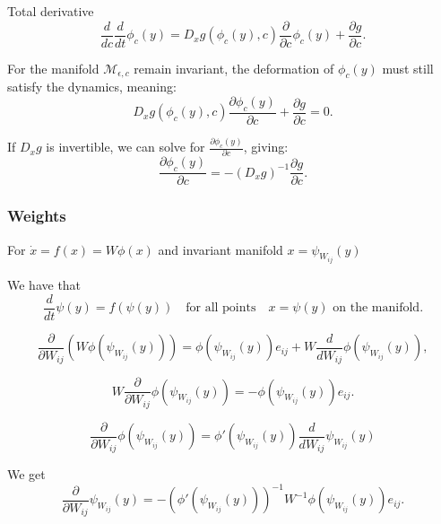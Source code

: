 \documentclass{article}
\theoremstyle{definition} \newtheorem{definition}{Definition}
\theoremstyle{remark} \newtheorem{remark}{Remark}
\newcommand{\manifold}{\mathcal{M}}
\newcounter{ct}
\begin{document}
Total derivative
\begin{equation}
\frac{d}{dc} \frac{d}{dt} \phi_c(y) = D_x g(\phi_c(y), c) \frac{\partial}{\partial c} \phi_c(y) + \frac{\partial g}{\partial c}.
\end{equation}


For the manifold $\manifold_{\epsilon,c}$ remain invariant, the deformation of $\phi_c(y)$ must still satisfy the dynamics, meaning:
\begin{equation}
D_x g(\phi_c(y), c) \frac{\partial \phi_c(y)}{\partial c} + \frac{\partial g}{\partial c} = 0.
\end{equation}

If $D_x g$ is invertible, we can solve for $\frac{\partial \phi_c(y)}{\partial c}$, giving:
\begin{equation}
\frac{\partial \phi_c(y)}{\partial c} = - (D_x g)^{-1} \frac{\partial g}{\partial c}.
\end{equation}


\subsubsection{Weights}
For $\dot x= f(x) =W\phi(x)$ and invariant manifold $x=\psi_{W_{ij}}(y)$

We have that 
\begin{equation}
\frac{d}{dt} \psi(y) =f(\psi(y)) \quad \text{for all points} \quad x = \psi(y) \text{ on the manifold}.
\end{equation}

\begin{equation}
\frac{\partial}{\partial W_{ij}} \left( W \phi(\psi_{W_{ij}}(y)) \right) = \phi(\psi_{W_{ij}}(y)) e_{ij} + W \frac{d}{dW_{ij}} \phi(\psi_{W_{ij}}(y)),
\end{equation}

\begin{equation}
W \frac{\partial}{\partial W_{ij}}  \phi(\psi_{W_{ij}}(y)) = - \phi(\psi_{W_{ij}}(y)) e_{ij}.
\end{equation}


\begin{equation}
\frac{\partial}{\partial W_{ij}}  \phi(\psi_{W_{ij}}(y)) = \phi'(\psi_{W_{ij}}(y))\frac{d}{dW_{ij}}\psi_{W_{ij}}(y)
\end{equation}

We get 
\begin{equation}
\frac{\partial}{\partial W_{ij}} \psi_{W_{ij}}(y) = - \left(\phi'(\psi_{W_{ij}}(y))\right)^{-1} W^{-1} \phi(\psi_{W_{ij}}(y)) e_{ij}.
\end{equation}
\end{document}
